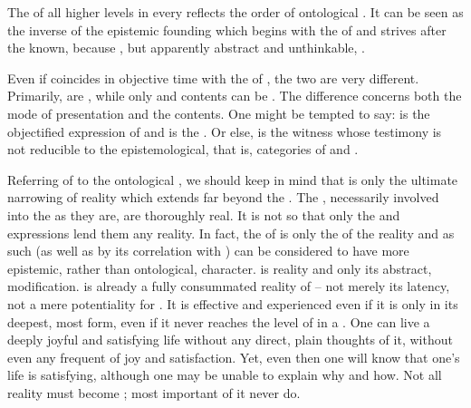 \pa
The  of all higher levels in every  reflects
the order of ontological . It can be seen as the inverse of the
epistemic founding which begins with the  of
 and strives after the known, because , but
apparently abstract and unthinkable, .

Even if  coincides in objective time with the  of
, the two are very different. Primarily,  are
, while only  and  contents can be
. The difference concerns both the mode of presentation and the
contents. One might be tempted to say:  is the {objectified
  expression} of  and  is the 
.  Or else,  is the witness whose testimony is not
reducible to the epistemological, that is,  categories of
 and .

Referring  of  to the ontological ,
we should keep in mind that  is only the ultimate narrowing of
reality which extends far beyond the \hoa.  The ,
necessarily involved into the  as they are, are thoroughly real.
It is not so that only the  and expressions lend them any
reality. In fact, the  of  is only the  of
the  reality and as such (as well as by its correlation with
) can be considered to have more epistemic, rather than
ontological, character.   is  reality and
 only its abstract,  modification.   is
already a fully consummated reality of  -- not merely its latency,
not a mere potentiality for .  It is effective and experienced
even if it is  only in its deepest, most  form, even if
it never reaches the level of  in a 
. One can live a deeply joyful and satisfying life without any direct,
plain thoughts of it, without even any frequent  of joy
and satisfaction. Yet, even then one will know that one's life is satisfying,
although one may be unable to explain  why and how. Not all
reality must become ; most important 
 of it never do.
  

